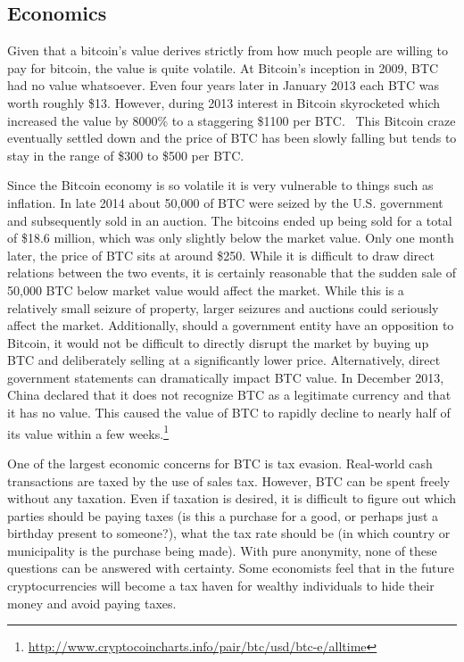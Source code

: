 \documentclass[11pt]{article}
\begin{document}
\subsection{Economics}
Given that a bitcoin's value derives strictly from how much people are willing to pay for bitcoin, the value is quite
volatile. At Bitcoin's inception in 2009, BTC had no value whatsoever. Even four years later in January 2013 each BTC
was worth roughly \$13. However, during 2013 interest in Bitcoin skyrocketed which increased the value by 8000\% to a
staggering \$1100 per BTC.~\cite{ciaian2014economics} This Bitcoin craze eventually settled down and the price of BTC
has been slowly falling but tends to stay in the range of \$300 to \$500 per BTC.

Since the Bitcoin economy is so volatile it is very vulnerable to things such as inflation. In late 2014 about 50,000
of BTC were seized by the U.S. government and subsequently sold in an auction.\cite{reutersgov} The bitcoins ended up
being sold for a total of \$18.6 million, which was only slightly below the market value. Only one month later, the
price of BTC sits at around \$250. While it is difficult to draw direct relations between the two events, it is
certainly reasonable that the sudden sale of 50,000 BTC below market value would affect the market. While this is a
relatively small seizure of property, larger seizures and auctions could seriously affect the market. Additionally,
should a government entity have an opposition to Bitcoin, it would not be difficult to directly disrupt the market by
buying up BTC and deliberately selling at a significantly lower price. Alternatively, direct government statements can
dramatically impact BTC value. In December 2013, China declared that it does not recognize BTC as a legitimate currency
and that it has no value. This caused the value of BTC to rapidly decline to nearly half of its value within a few
weeks.\footnote{\url{http://www.cryptocoincharts.info/pair/btc/usd/btc-e/alltime}}

One of the largest economic concerns for BTC is tax evasion. Real-world cash transactions are taxed by the use of sales
tax. However, BTC can be spent freely without any taxation. Even if taxation is desired, it is difficult to figure out
which parties should be paying taxes (is this a purchase for a good, or perhaps just a birthday present to someone?),
what the tax rate should be (in which country or municipality is the purchase being made). With pure anonymity, none of
these questions can be answered with certainty. Some economists feel that in the future cryptocurrencies will become a
tax haven for wealthy individuals to hide their money and avoid paying taxes.\cite{marian2013}
\end{document}
